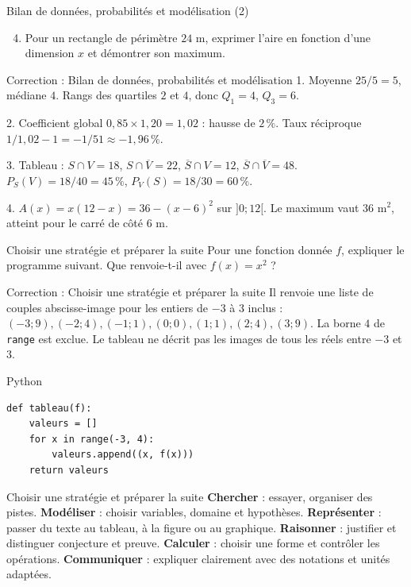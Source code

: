 \documentclass[aspectratio=169,10pt]{beamer}
\begin{document}
\begin{frame}{Bilan de données, probabilités et modélisation (2)}
\begin{enumerate}
\setcounter{enumi}{3}\item Pour un rectangle de périmètre \(24\) m, exprimer l'aire en fonction d'une dimension \(x\) et démontrer son maximum.

\end{enumerate}
\end{frame}
\begin{frame}{Correction : Bilan de données, probabilités et modélisation}
1. Moyenne \(25/5=5\), médiane \(4\). Rangs des quartiles \(2\) et \(4\), donc \(Q_1=4\), \(Q_3=6\).

2. Coefficient global \(0{,}85\times1{,}20=1{,}02\) : hausse de \(2\,\%\). Taux réciproque \(1/1{,}02-1=-1/51\approx-1{,}96\,\%\).

3. Tableau : \(S\cap V=18\), \(S\cap\overline V=22\), \(\overline S\cap V=12\), \(\overline S\cap\overline V=48\). \(P_S(V)=18/40=45\,\%\), \(P_V(S)=18/30=60\,\%\).

4. \(A(x)=x(12-x)=36-(x-6)^2\) sur \(]0;12[\). Le maximum vaut \(36\) m\(^2\), atteint pour le carré de côté \(6\) m.
\end{frame}
\begin{frame}{Choisir une stratégie et préparer la suite}
Pour une fonction donnée \(f\), expliquer le programme suivant. Que renvoie-t-il avec \(f(x)=x^2\) ?
\end{frame}
\begin{frame}{Correction : Choisir une stratégie et préparer la suite}
Il renvoie une liste de couples abscisse-image pour les entiers de \(-3\) à \(3\) inclus : \((-3;9),(-2;4),(-1;1),(0;0),(1;1),(2;4),(3;9)\). La borne \(4\) de \texttt{range} est exclue. Le tableau ne décrit pas les images de tous les réels entre \(-3\) et \(3\).
\end{frame}
\begin{frame}[fragile]{Python}
\small
\begin{verbatim}
def tableau(f):
    valeurs = []
    for x in range(-3, 4):
        valeurs.append((x, f(x)))
    return valeurs
\end{verbatim}
\end{frame}
\begin{frame}{Choisir une stratégie et préparer la suite}
\textbf{Chercher} : essayer, organiser des pistes. \textbf{Modéliser} : choisir variables, domaine et hypothèses. \textbf{Représenter} : passer du texte au tableau, à la figure ou au graphique. \textbf{Raisonner} : justifier et distinguer conjecture et preuve. \textbf{Calculer} : choisir une forme et contrôler les opérations. \textbf{Communiquer} : expliquer clairement avec des notations et unités adaptées.
\end{frame}
\end{document}
